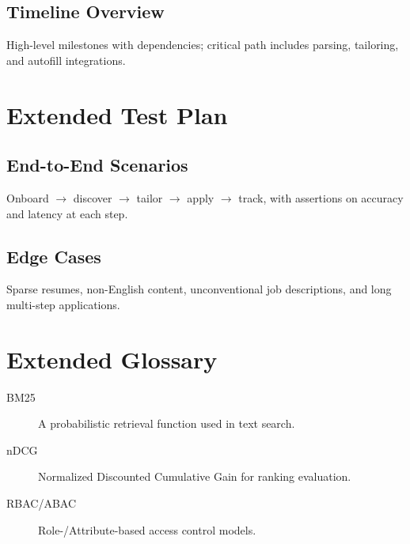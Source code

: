 \documentclass[12pt,a4paper]{article}
\begin{document}
\subsection{Timeline Overview}
High-level milestones with dependencies; critical path includes parsing, tailoring, and autofill integrations.

\section{Extended Test Plan}
\subsection{End-to-End Scenarios}
Onboard \(\rightarrow\) discover \(\rightarrow\) tailor \(\rightarrow\) apply \(\rightarrow\) track, with assertions on accuracy and latency at each step.
\subsection{Edge Cases}
Sparse resumes, non-English content, unconventional job descriptions, and long multi-step applications.

\section{Extended Glossary}
\begin{description}
  \item[BM25] A probabilistic retrieval function used in text search.
  \item[nDCG] Normalized Discounted Cumulative Gain for ranking evaluation.
  \item[RBAC/ABAC] Role-/Attribute-based access control models.
\end{description}
\end{document}
